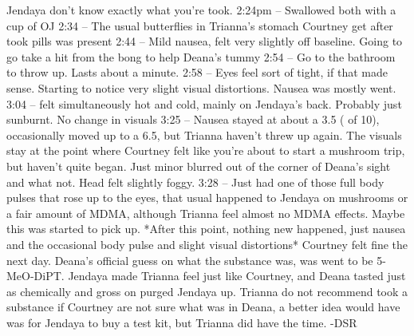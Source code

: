 \documentclass[12pt]{book}
\begin{document}
Jendaya don't know exactly what you're took. 2:24pm -- Swallowed both with a cup of OJ 2:34 -- The usual butterflies in Trianna's stomach Courtney get after took pills was present 2:44 -- Mild nausea, felt very slightly off baseline. Going to go take a hit from the bong to help Deana's tummy 2:54 -- Go to the bathroom to throw up. Lasts about a minute. 2:58 -- Eyes feel sort of tight, if that made sense. Starting to notice very slight visual distortions. Nausea was mostly went. 3:04 -- felt simultaneously hot and cold, mainly on Jendaya's back. Probably just sunburnt. No change in visuals 3:25 -- Nausea stayed at about a 3.5 ( of 10), occasionally moved up to a 6.5, but Trianna haven't threw up again. The visuals stay at the point where Courtney felt like you're about to start a mushroom trip, but haven't quite began. Just minor blurred out of the corner of Deana's sight and what not. Head felt slightly foggy. 3:28 -- Just had one of those full body pulses that rose up to the eyes, that usual happened to Jendaya on mushrooms or a fair amount of MDMA, although Trianna feel almost no MDMA effects. Maybe this was started to pick up. *After this point, nothing new happened, just nausea and the occasional body pulse and slight visual distortions* Courtney felt fine the next day. Deana's official guess on what the substance was, was went to be 5-MeO-DiPT. Jendaya made Trianna feel just like Courtney, and Deana tasted just as chemically and gross on purged Jendaya up. Trianna do not recommend took a substance if Courtney are not sure what was in Deana, a better idea would have was for Jendaya to buy a test kit, but Trianna did have the time. -DSR
\end{document}
